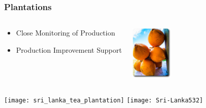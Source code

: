 \documentclass[serif,mathserif]{beamer}
\begin{document}
\begin{frame}
  \frametitle{Plantations}
\begin{columns}
\begin{center}
\begin{itemize}
 \item Close Monitoring of Production
 \item Production Improvement Support
\end{itemize}
\end{center}
\begin{flushleft}
 \hspace{3.5mm}
 \includegraphics[width=2cm]{thambili}
\end{flushleft}
\end{columns}
\begin{center}
 \texttt{[image: sri\_lanka\_tea\_plantation]}
 \hspace{5mm}
 \texttt{[image: Sri-Lanka532]}
\end{center}
\end{frame}
\end{document}
